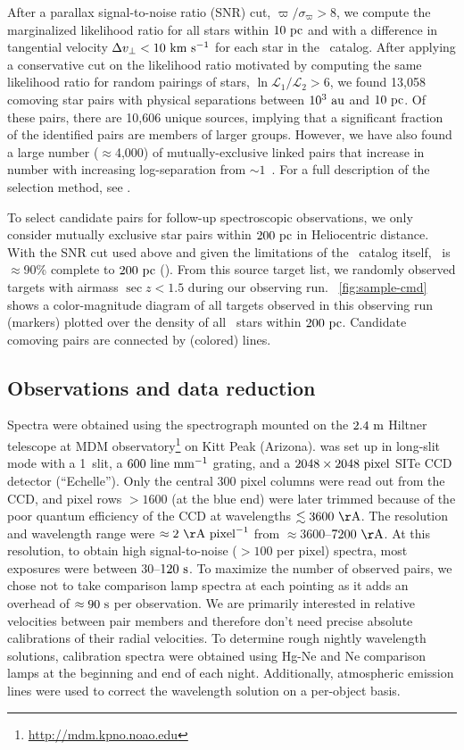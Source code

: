 \documentclass[modern, letterpaper]{aastex61}
\newcommand{\tgas}{\acronym{TGAS}}
\begin{document}
After a parallax signal-to-noise ratio (SNR) cut, $\varpi/\sigma_\varpi > 8$,
we compute the marginalized likelihood ratio for all stars within $10~\mathrm{pc}$ and
with a difference in tangential velocity $\Delta v_\perp < 10~\mathrm{km}~\mathrm{s}^{-1}$ for each
star in the \tgas\ catalog.
After applying a conservative cut on the likelihood ratio motivated by computing
the same likelihood ratio for random pairings of stars, $\ln
\mathcal{L}_1/\mathcal{L}_2 > 6$, we found 13,058 comoving star pairs with
physical separations between $10^3~\mathrm{au}$ and $10~\mathrm{pc}$.
Of these pairs, there are 10,606 unique sources, implying that a significant
fraction of the identified pairs are members of larger groups.
However, we have also found a large number ($\approx$4,000) of
mutually-exclusive linked pairs that increase in number with increasing
log-separation from $\sim 1$~\pc.
For a full description of the selection method, see \citealt{Oh:2017}.

To select candidate pairs for follow-up spectroscopic observations, we only
consider mutually exclusive star pairs within $200~\mathrm{pc}$ in Heliocentric
distance.
With the SNR cut used above and given the limitations of the \tgas\ catalog
itself, \tgas\ is $\approx$90\% complete to $200~\mathrm{pc}$ (\citealt{Bovy:2017}).
From this source target list, we randomly observed targets with airmass $\sec z
< 1.5$ during our observing run.
\figurename~\ref{fig:sample-cmd} shows a color-magnitude diagram of all targets
observed in this observing run (markers) plotted over the density of all \tgas\
stars within $200~\mathrm{pc}$.
Candidate comoving pairs are connected by (colored) lines.

\subsection{Observations and data reduction}\label{sec:reduction}

Spectra were obtained using the  spectrograph mounted on the
$2.4~{\rm m}$ Hiltner telescope at MDM
observatory\footnote{\url{http://mdm.kpno.noao.edu}} on Kitt Peak (Arizona).
\project{Modspec} was set up in long-slit mode with a 1\arcsec\ slit, a
$600~{\rm line}~{\rm mm}^{-1}$ grating, and a $2048\times2048~{\rm pixel}$ SITe
CCD detector (``Echelle'').
Only the central 300 pixel columns were read out from the CCD, and pixel rows
$>1600$ (at the blue end) were later trimmed because of the poor quantum
efficiency of the CCD at wavelengths $\lesssim 3600~{\rm \AA}$.
The resolution and wavelength range were $\approx2~{\rm \AA}~{\rm pixel}^{-1}$
from $\approx 3600$--$7200~{\rm \AA}$.
At this resolution, to obtain high signal-to-noise ($>100$ per pixel) spectra,
most exposures were between $30$--$120~{\rm s}$.
To maximize the number of observed pairs, we chose not to take
comparison lamp spectra at each pointing as it adds an overhead of $\approx
90~{\rm s}$ per observation.
We are primarily interested in relative velocities between pair members and
therefore don't need precise absolute calibrations of their radial velocities.
To determine rough nightly wavelength solutions, calibration spectra were
obtained using Hg-Ne and Ne comparison lamps at the beginning and end of each
night.
Additionally, atmospheric emission lines were used to correct the wavelength
solution on a per-object basis.
\end{document}
